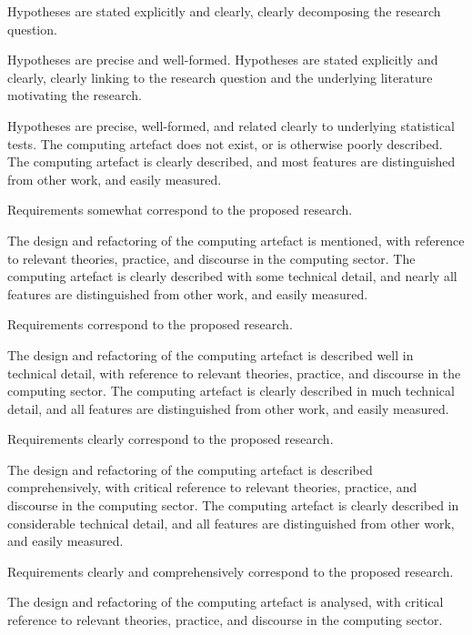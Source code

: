 \begin{markingrubric}
        \grade 		Hypotheses are stated explicitly and clearly, clearly decomposing the research question.
        \par		Hypotheses are precise and well-formed.
        \grade 		Hypotheses are stated explicitly and clearly, clearly linking to the research question and the underlying literature motivating the research.
        \par		Hypotheses are precise, well-formed, and related clearly to underlying statistical tests.
%
        \grade \fail The computing artefact does not exist, or is otherwise poorly described.
        \grade The computing artefact is clearly described, and most features are distinguished from other work, and easily measured.
            \par Requirements somewhat correspond to the proposed research.
            \par The design and refactoring of the computing artefact is mentioned, with reference to relevant theories, practice, and discourse in the computing sector.
        \grade The computing artefact is clearly described with some technical detail, and nearly all features are distinguished from other work, and easily measured.
            \par Requirements correspond to the proposed research.
            \par The design and refactoring of the computing artefact is described well in technical detail, with reference to relevant theories, practice, and discourse in the computing sector.
        \grade The computing artefact is clearly described in much technical detail, and all features are distinguished from other work, and easily measured.
            \par Requirements clearly correspond to the proposed research.
            \par The design and refactoring of the computing artefact is described comprehensively, with critical reference to relevant theories, practice, and discourse in the computing sector.
        \grade The computing artefact is clearly described in considerable technical detail, and all features are distinguished from other work, and easily measured.
            \par Requirements clearly and comprehensively correspond to the proposed research.
            \par The design and refactoring of the computing artefact is analysed, with critical reference to relevant theories, practice, and discourse in the computing sector.

\end{markingrubric}
